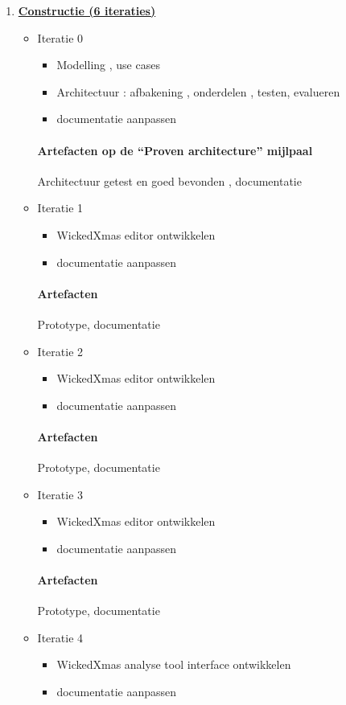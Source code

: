 \begin{enumerate}
\item \underline{\textbf{Constructie (6 iteraties)}}
	\begin{itemize}
	\item Iteratie 0
		\begin{itemize}
		\item Modelling , use cases
		\item Architectuur : afbakening , onderdelen , testen, evalueren
		\item documentatie aanpassen
		\end{itemize}
		\paragraph{Artefacten op de ``Proven architecture''  mijlpaal}
		 Architectuur getest en goed bevonden , documentatie
	\item Iteratie 1
		\begin{itemize}
		\item WickedXmas editor ontwikkelen
		\item documentatie aanpassen
		\end{itemize}
		\paragraph{Artefacten}
		Prototype, documentatie
	\item Iteratie 2
		\begin{itemize}
		\item WickedXmas editor ontwikkelen
		\item documentatie aanpassen
		\end{itemize}
		\paragraph{Artefacten}
		Prototype, documentatie
	\item Iteratie 3
		\begin{itemize}
		\item WickedXmas editor ontwikkelen
		\item documentatie aanpassen
		\end{itemize}
		\paragraph{Artefacten}
		Prototype, documentatie
	\item Iteratie 4
		\begin{itemize}
		\item WickedXmas analyse tool interface ontwikkelen
		\item documentatie aanpassen
		\end{itemize}

\end{itemize}
\end{enumerate}
